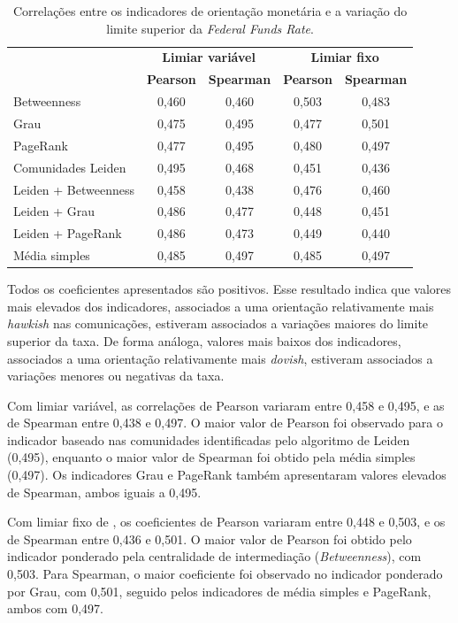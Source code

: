 \begin{table}[htbp]
\centering
\caption{Correlações entre os indicadores de orientação monetária e a variação do 
limite superior da \textit{Federal Funds Rate}.}
\label{tab:correlacoes-upper-rate-change}

\begin{tabular}{lcccc}
\hline
& \multicolumn{2}{c}{\textbf{Limiar variável}} & \multicolumn{2}{c}{\textbf{Limiar fixo}} \\
\textbf{ } & \textbf{Pearson} & \textbf{Spearman} & \textbf{Pearson} & \textbf{Spearman} \\
\hline
Betweenness & 0,460 & 0,460 & 0,503 & 0,483 \\
Grau & 0,475 & 0,495 & 0,477 & 0,501 \\
PageRank & 0,477 & 0,495 & 0,480 & 0,497 \\
Comunidades Leiden & 0,495 & 0,468 & 0,451 & 0,436 \\
Leiden + Betweenness & 0,458 & 0,438 & 0,476 & 0,460 \\
Leiden + Grau & 0,486 & 0,477 & 0,448 & 0,451 \\
Leiden + PageRank & 0,486 & 0,473 & 0,449 & 0,440 \\
Média simples & 0,485 & 0,497 & 0,485 & 0,497 \\
\hline
\end{tabular}

\medskip
{}
\end{table}

Todos os coeficientes apresentados são positivos. Esse resultado indica que 
valores mais elevados dos indicadores, associados a uma orientação relativamente 
mais \textit{hawkish} nas comunicações, estiveram associados a variações maiores 
do limite superior da taxa. De forma análoga, valores mais baixos dos indicadores, 
associados a uma orientação relativamente mais \textit{dovish}, estiveram 
associados a variações menores ou negativas da taxa.

Com limiar variável, as correlações de Pearson variaram entre 0,458 e 0,495, e as 
de Spearman entre 0,438 e 0,497. O maior valor de Pearson foi observado para o 
indicador baseado nas comunidades identificadas pelo algoritmo de Leiden (0,495), 
enquanto o maior valor de Spearman foi obtido pela média simples (0,497). Os 
indicadores Grau e PageRank também apresentaram valores elevados de Spearman, 
ambos iguais a 0,495.

Com limiar fixo de \ConstantSimilarityCutoff, os coeficientes de Pearson variaram entre 0,448 e 0,503, 
e os de Spearman entre 0,436 e 0,501. O maior valor de Pearson foi obtido pelo 
indicador ponderado pela centralidade de intermediação (\textit{Betweenness}), com 
0,503. Para Spearman, o maior coeficiente foi observado no indicador ponderado por 
Grau, com 0,501, seguido pelos indicadores de média simples e PageRank, ambos com 
0,497.

